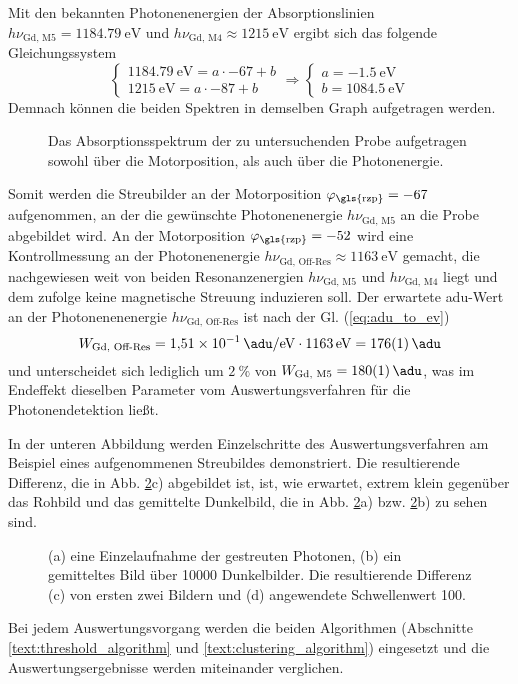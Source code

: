 \noindent
Mit den bekannten Photonenenergien der Absorptionslinien $h\nu_\text{Gd, M5} = \SI{1184,79}{\eV}$ und $h\nu_\text{Gd, M4} \approx \SI{1215}{\eV}$ ergibt sich das folgende Gleichungssystem
\begin{equation}
    \begin{cases}
    \SI{1184,79}{\eV} = a\cdot \num{-67} + b\\
    \SI{1215}{\eV} = a\cdot \num{-87} + b
    \end{cases}
    \Rightarrow
    \begin{cases}
    a = \SI{-1,5}{\eV}\\
    b = \SI{1084,5}{\eV}
    \end{cases}
    \label{eq:rzp_phi_to_ev}
\end{equation}
\noindent
Demnach können die beiden Spektren in demselben Graph aufgetragen werden.
\begin{figure}[H]
    \centering
    
    \caption{Das Absorptionsspektrum der zu untersuchenden Probe aufgetragen sowohl über die Motorposition, als auch über die Photonenergie.}
    \label{fig:rzp_phi_ev}
\end{figure}
\noindent
Somit werden die Streubilder an der Motorposition $\varphi_\text{\gls{rzp}} = \num{-67}$ aufgenommen, an der die gewünschte Photonenenergie $h\nu_\text{Gd, M5}$ an die Probe abgebildet wird. An der Motorposition $\varphi_\text{\gls{rzp}} = \num{-52}$ wird eine Kontrollmessung an der Photonenenergie $h\nu_\text{Gd, Off-Res} \approx \SI{1163}{\eV}$ gemacht, die nachgewiesen weit von beiden Resonanzenergien $h\nu_\text{Gd, M5}$ und $h\nu_\text{Gd, M4}$ liegt und dem zufolge keine magnetische Streuung induzieren soll. Der erwartete \gls{adu}-Wert an der Photonenenenergie $h\nu_\text{Gd, Off-Res}$ ist nach der Gl. (\ref{eq:adu_to_ev})
\begin{equation}
    W_\text{Gd, Off-Res} = \SI{1,51e-1}{\adu\per\eV} \cdot \SI{1163}{\eV} = \SI{176(1)}{\adu}
\end{equation}
und unterscheidet sich lediglich um $\SI{2}{\percent}$ von $W_\text{Gd, M5} = \SI{180(1)}{\adu}$, was im Endeffekt dieselben Parameter vom Auswertungsverfahren für die Photonendetektion ließt.

\noindent
In der unteren Abbildung werden Einzelschritte des Auswertungsverfahren am Beispiel eines aufgenommenen Streubildes demonstriert. 
Die resultierende Differenz, die in Abb. \ref{fig:capture_ped_diff}c) abgebildet ist, ist, wie erwartet, extrem klein gegenüber das Rohbild und das gemittelte Dunkelbild, die in Abb. \ref{fig:capture_ped_diff}a) bzw. \ref{fig:capture_ped_diff}b) zu sehen sind. 
\begin{figure}[H]
    \centering
    
    \caption{(a) eine Einzelaufnahme der gestreuten Photonen, (b) ein gemitteltes Bild über \num{10000} Dunkelbilder.  Die resultierende Differenz (c) von ersten zwei Bildern und (d) angewendete Schwellenwert \SI{100}{\adu}.}
    \label{fig:capture_ped_diff}
\end{figure}
\noindent
Bei jedem Auswertungsvorgang werden die beiden Algorithmen (Abschnitte \ref{text:threshold_algorithm} und \ref{text:clustering_algorithm}) eingesetzt und die Auswertungsergebnisse werden miteinander verglichen. 
